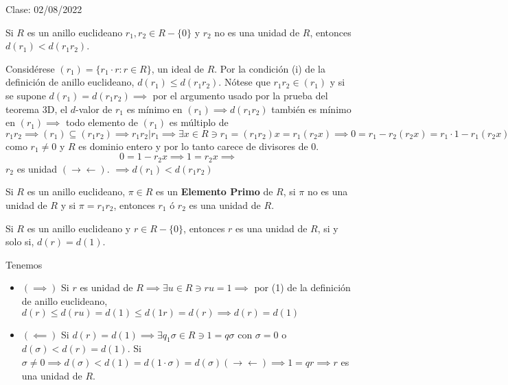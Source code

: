 Clase: 02/08/2022


\begin{lema}[3.10]
    Si $R$ es un anillo euclideano $r_1,r_2\in R-\{0\}$ y $r_2$ no es una unidad de $R$, entonces $d(r_1)<d(r_1r_2)$.     
    \begin{dem}
        Considérese $(r_1)=\{r_1\cdot r: r\in R\}$, un ideal de $R$. Por la condición (i) de la definición de anillo euclideano, $d(r_1)\leq d(r_1r_2)$. Nótese que $r_1r_2\in (r_1)$ y si se supone $d(r_1)=d(r_1r_2)\implies$ por el argumento usado por la prueba del teorema 3D, el $d$-valor de $r_1$ es mínimo en $(r_1)\implies d(r_1r_2)$ también es mínimo en $(r_1)\implies$ todo elemento de $(r_1)$ es múltiplo de $r_1r_2\implies (r_1)\subseteq (r_1r_2)\implies r_1r_2|r_1\implies\exists x\in R\ni r_1=(r_1r_2)x=r_1(r_2x)\implies 0=r_1-r_2(r_2x)=r_1\cdot 1-r_1(r_2x)=r_1(1-r_2x)\implies$ como $r_1\neq0$ y $R$ es dominio entero y por lo tanto carece de divisores de $0$. 
        $$0=1-r_2x\implies 1=r_2x\implies$$
        $r_2$ es unidad $(\to\gets)$. $\implies d(r_1)<d(r_1r_2)$ 
    \end{dem}
\end{lema}

\begin{definicion}
    Si $R$ es un anillo euclideano, $\pi \in R$ es un \textbf{Elemento Primo} de $R$, si $\pi$ no es una unidad de $R$ y si $\pi=r_1r_2$, entonces $r_1$ ó $r_2$ es una unidad de $R$. 
\end{definicion}

\begin{prop}
    Si $R$ es un anillo euclideano y $r\in R-\{0\}$, entonces $r$ es una unidad de $R$, si y solo si, $d(r)=d(1)$. 
    \begin{dem}
        Tenemos
        \begin{itemize}
            \item $(\implies)$ Si $r$ es unidad de $R\implies\exists u\in R\ni ru=1\implies$ por (1) de la definición de anillo euclideano, $d(r)\leq d(ru)=d(1)\leq d(1r)=d(r)\implies d(r)=d(1)$
            \item $(\impliedby)$ Si $d(r)=d(1)\implies \exists q_1\sigma \in R\ni 1= q\sigma $ con $\sigma =0$ o $d(\sigma)<d(r)=d(1)$. Si $\sigma \neq 0\implies d(\sigma)<d(1)=d(1\cdot \sigma)=d(\sigma)(\to\gets)\implies 1=qr\implies r$ es una unidad de $R$. 
        \end{itemize}
    \end{dem}
\end{prop}

